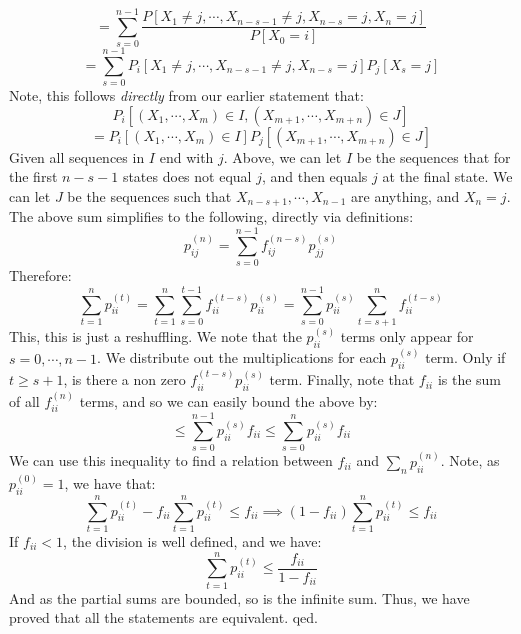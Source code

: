\documentclass[12pt,a4paper]{article}
\newcommand{\1}[1]{\mathbbm{1}\left\{ #1 \right\}}
\begin{document}
$$
	= \sum_{s = 0}^{n-1} \frac{P\left[X_1 \neq j, \cdots, X_{n - s - 1} \neq j, X_{n - s} = j, X_n = j\right]}
	{P\left[X_0 = i\right]}
$$
$$
	= \sum_{s = 0}^{n-1} 
	P_i\left[X_1 \neq j, \cdots, X_{n - s - 1} \neq j, X_{n - s} = j\right]
	P_j\left[X_s = j\right]
$$
Note, this follows \textit{directly} from our earlier statement that:
$$
	P_i\left[(X_1, \cdots, X_m) \in I, (X_{m+1}, \cdots, X_{m + n}) \in J\right]
$$
$$
	=
	P_i\left[(X_1, \cdots, X_m) \in I\right]
	P_j\left[(X_{m+1}, \cdots, X_{m + n}) \in J\right]
$$
Given all sequences in $I$ end with $j$. Above, we can let $I$ be the sequences that for the first $n - s - 1$ states does not equal $j$, and then equals $j$ at the final state. We can let $J$ be the sequences such that $X_{n - s + 1}, \cdots, X_{n - 1}$ are anything, and $X_n = j$. The above sum simplifies to the following, directly via definitions:
$$
	p_{ij}^{(n)} = \sum_{s=0}^{n-1} f_{ij}^{(n-s)}p_{jj}^{(s)}
$$
Therefore:
$$
	\sum_{t=1}^n p_{ii}^{(t)} =
	\sum_{t=1}^n \sum_{s=0}^{t-1} f_{ii}^{(t-s)}p_{ii}^{(s)} =
	\sum_{s=0}^{n-1} p_{ii}^{(s)} \sum_{t=s+1}^n f_{ii}^{(t-s)}
$$
This, this is just a reshuffling. We note that the $p_{ii}^{(s)}$ terms only appear for $s = 0, \cdots, n - 1$. We distribute out the multiplications for each $p_{ii}^{(s)}$ term. Only if $t \geq s + 1$, is there a non zero $f_{ii}^{(t-s)}p_{ii}^{(s)}$ term. Finally, note that $f_{ii}$ is the sum of all $f_{ii}^{(n)}$ terms, and so we can easily bound the above by:
$$
	\leq \sum_{s=0}^{n-1} p_{ii}^{(s)} f_{ii} \leq
	\sum_{s=0}^n p_{ii}^{(s)} f_{ii}
$$
We can use this inequality to find a relation between $f_{ii}$ and $\sum_n p_{ii}^{(n)}$. Note, as $p_{ii}^{(0)} = 1$, we have that:
$$
	\sum_{t=1}^n p_{ii}^{(t)} - f_{ii} \sum_{t=1}^n p_{ii}^{(t)} \leq f_{ii} \implies
	(1 - f_{ii})\sum_{t=1}^n p_{ii}^{(t)} \leq f_{ii}
$$
If $f_{ii} < 1$, the division is well defined, and we have:
$$
	\sum_{t=1}^n p_{ii}^{(t)} \leq \frac{f_{ii}}{1 - f_{ii}}
$$
And as the partial sums are bounded, so is the infinite sum. Thus, we have proved that all the statements are equivalent. qed.
\end{document}
